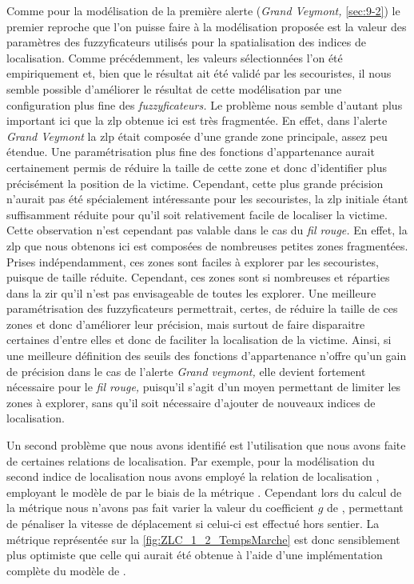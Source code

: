 Comme pour la modélisation de la première alerte (\emph{Grand
  Veymont,} \autoref{sec:9-2}) le premier reproche que l'on puisse
faire à la modélisation proposée est la valeur des paramètres des
fuzzyficateurs utilisés pour la spatialisation des indices de
localisation. Comme précédemment, les valeurs sélectionnées l'on été
empiriquement et, bien que le résultat ait été validé par les
secouristes, il nous semble possible d'améliorer le résultat de cette
modélisation par une configuration plus fine des
\emph{fuzzyficateurs.} Le problème nous semble d'autant plus important
ici que la \ac{zlp} obtenue ici est très fragmentée. En effet, dans
l'alerte \emph{Grand Veymont} la \ac{zlp} était composée d'une grande
zone principale, assez peu étendue. Une paramétrisation plus fine des
fonctions d'appartenance aurait certainement permis de réduire la
taille de cette zone et donc d'identifier plus précisément la position
de la victime. Cependant, cette plus grande précision n'aurait pas été
spécialement intéressante pour les secouristes, la \ac{zlp} initiale
étant suffisamment réduite pour qu'il soit relativement facile de
localiser la victime. Cette observation n'est cependant pas valable
dans le cas du \emph{fil rouge.} En effet, la \ac{zlp} que nous
obtenons ici est composées de nombreuses petites zones
fragmentées. Prises indépendamment, ces zones sont faciles à explorer
par les secouristes, puisque de taille réduite. Cependant, ces zones
sont si nombreuses et réparties dans la \ac{zir} qu'il n'est pas
envisageable de toutes les explorer. Une meilleure paramétrisation des
fuzzyficateurs permettrait, certes, de réduire la taille de ces zones
et donc d'améliorer leur précision, mais surtout de faire disparaitre
certaines d'entre elles et donc de faciliter la localisation de la
victime. Ainsi, si une meilleure définition des seuils des fonctions
d'appartenance n'offre qu'un gain de précision dans le cas de l'alerte
\emph{Grand veymont,} elle devient fortement nécessaire pour le
\emph{fil rouge,} puisqu'il s'agit d'un moyen permettant de limiter
les zones à explorer, sans qu'il soit nécessaire d'ajouter de nouveaux
indices de localisation.

Un second problème que nous avons identifié est l'utilisation que nous
avons faite de certaines relations de localisation. Par exemple, pour
la modélisation du second indice de localisation nous avons employé la
relation de localisation ,
employant le modèle de \textcite{Tobler1993} par le biais de la
métrique . Cependant lors du calcul de la
métrique nous n'avons pas fait varier la valeur du coefficient \(g\)
de \textcite{Tobler1993}, permettant de pénaliser la vitesse de
déplacement si celui-ci est effectué hors sentier. La métrique
représentée sur la \autoref{fig:ZLC_1_2_TempsMarche} est donc
sensiblement plus optimiste que celle qui aurait été obtenue à l'aide
d'une implémentation complète du modèle de \textcite{Tobler1993}.

